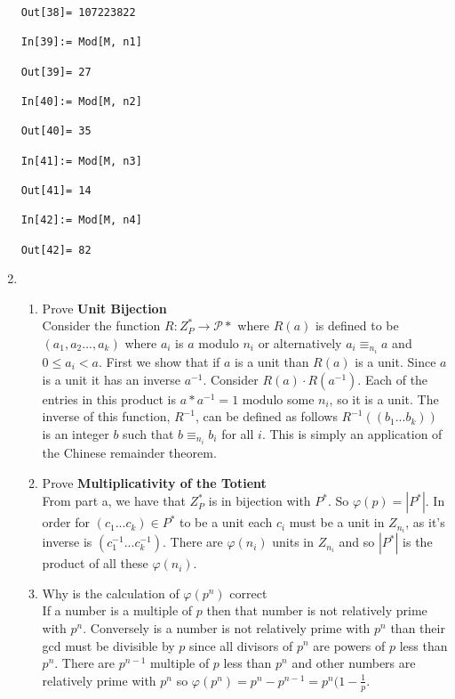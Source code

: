 \documentclass[12pt]{amsart}
\theoremstyle{definition}
\newcommand{\mc}[1]{\mathcal{#1}}
\begin{document}
\begin{enumerate}
\begin{verbatim}
Out[38]= 107223822

In[39]:= Mod[M, n1]

Out[39]= 27

In[40]:= Mod[M, n2]

Out[40]= 35

In[41]:= Mod[M, n3]

Out[41]= 14

In[42]:= Mod[M, n4]

Out[42]= 82
\end{verbatim}


\newpage %
\item 
\begin{enumerate}
\item Prove {\bfseries Unit Bijection}
\\

	Consider the function $R\colon Z_P^*\to \mc{P}*$ where $R(a)$ is defined to be $(a_1,a_2...,a_k)$ where $a_i$ is $a$ modulo $n_i$ or alternatively $a_i \equiv_{n_i} a$ and $0 \leq a_i < a$.
	First we show that if $a$ is a unit than $R(a)$ is a unit. Since $a$ is a unit it has an inverse $a^{-1}$. Consider $R(a)\cdot R(a^{-1})$. Each of the entries in this product is $a*a^{-1}=1$ modulo some $n_i$, so it is a unit. 
	The inverse of this function, $R^{-1}$, can be defined as follows $R^{-1}((b_1...b_k))$ is an integer $b$ such that $b \equiv_{n_i} b_i$ for all $i$. This is simply an application of the Chinese remainder theorem.    
\\
\item Prove {\bfseries Multiplicativity of the Totient}
\\
From part a, we have that $Z_P^*$ is in bijection with $P^*$. So $\varphi(p)=|P^*|$. In order for $(c_1...c_k) \in P^*$ to be a unit each $c_i$ must be a unit in $Z_{n_i}$, as it's inverse is $(c^{-1}_1...c^{-1}_k)$. There are $\varphi(n_i)$ units in $Z_{n_i}$ and so $|P^*|$ is the product of all these $\varphi(n_i)$.
\\
\item Why is the calculation of $\varphi(p^n)$ correct
\\
If a number is a multiple of $p$ then that number is not relatively prime with $p^n$. Conversely is a number is not relatively prime with $p^n$ than their gcd must be divisible by $p$ since all divisors of $p^n$ are powers of $p$ less than $p^n$. There are $p^{n-1}$ multiple of $p$ less than $p^n$ and other numbers are relatively prime with $p^n$ so $\varphi(p^n)=p^n-p^{n-1}=p^n(1-\frac{1}{p}$.
\\

\end{enumerate}
\end{enumerate}
\end{document}
